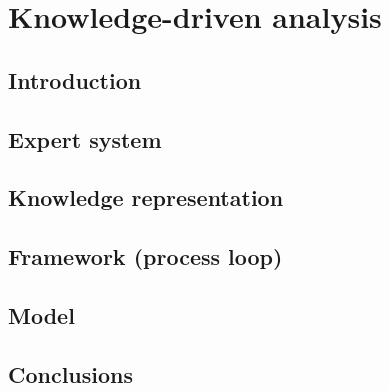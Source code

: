 \chapter{Knowledge-driven analysis}
\label{chap:knowledge}
\graphicspath{{./chapters/5-knowledge/figs/}}

\section{Introduction}
\label{sec:kn:introduction}

\section{Expert system} %
\label{sec:kn:expert_system}


\section{Knowledge representation} %
\label{sec:kn:knowledge_representation}


\section{Framework (process loop)} %
\label{sec:kn:framework_}


\section{Model} %
\label{sec:kn:model}


\section{Conclusions}
\label{sec:kn:conclusion}
